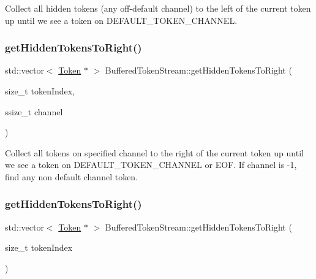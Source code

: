 Collect all hidden tokens (any off-\/default channel) to the left of the current token up until we see a token on D\+E\+F\+A\+U\+L\+T\+\_\+\+T\+O\+K\+E\+N\+\_\+\+C\+H\+A\+N\+N\+EL. 

\mbox{\label{classantlr4_1_1BufferedTokenStream_a6c260c6968178e322e5651ef0766925e}} 
\subsubsection{\texorpdfstring{get\+Hidden\+Tokens\+To\+Right()}{getHiddenTokensToRight()}\hspace{0.1cm}{\footnotesize\ttfamily [1/2]}}
{\footnotesize\ttfamily std\+::vector$<$ \hyperlink{classantlr4_1_1Token}{Token} $\ast$ $>$ Buffered\+Token\+Stream\+::get\+Hidden\+Tokens\+To\+Right (\begin{DoxyParamCaption}\item[{size\+\_\+t}]{token\+Index,  }\item[{ssize\+\_\+t}]{channel }\end{DoxyParamCaption})\hspace{0.3cm}{\ttfamily [virtual]}}

Collect all tokens on specified channel to the right of the current token up until we see a token on D\+E\+F\+A\+U\+L\+T\+\_\+\+T\+O\+K\+E\+N\+\_\+\+C\+H\+A\+N\+N\+EL or E\+OF. If channel is -\/1, find any non default channel token. \mbox{\label{classantlr4_1_1BufferedTokenStream_a962f9c5cfb338e728948510a687174ec}} 
\subsubsection{\texorpdfstring{get\+Hidden\+Tokens\+To\+Right()}{getHiddenTokensToRight()}\hspace{0.1cm}{\footnotesize\ttfamily [2/2]}}
{\footnotesize\ttfamily std\+::vector$<$ \hyperlink{classantlr4_1_1Token}{Token} $\ast$ $>$ Buffered\+Token\+Stream\+::get\+Hidden\+Tokens\+To\+Right (\begin{DoxyParamCaption}\item[{size\+\_\+t}]{token\+Index }\end{DoxyParamCaption})\hspace{0.3cm}{\ttfamily [virtual]}}



